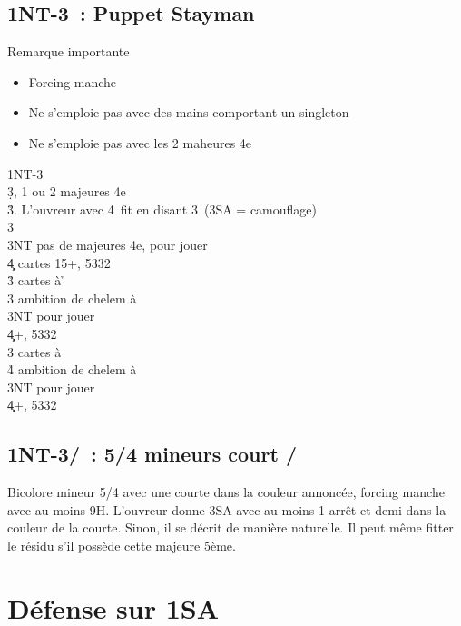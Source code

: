 \documentclass[a4paper]{article}
\begin{document}
\subsection{1NT-3\pdfc\ : Puppet Stayman}

Remarque importante

\begin{itemize}
\item Forcing manche

\item Ne s'emploie pas avec des mains comportant un singleton 

\item Ne s'emploie pas avec les 2 maheures 4e

\end{itemize}

\begin{bidtable}
1NT-3\c\\
3\d {}, 1 ou 2 majeures 4e\+\\
3\h {}\s . L'ouvreur avec 4\s\ fit en disant 3\s\ (3SA = camouflage)\\
3\s {}\h \\
3NT \> pas de majeures 4e, pour jouer\\
4\c\d {} cartes 15+, 5332\-\\
3\h {} cartes à \h \+\\
3\s \> ambition de chelem à \h \\
3NT \> pour jouer\\
4\c\d {}+, 5332\-\\
3\s {} cartes à \s \+\\
4\h \> ambition de chelem à \s \\
3NT \> pour jouer\\
4\c\d {}+, 5332\-
\end{bidtable}

\subsection{1NT-3\pdfh/\pdfs\ : 5/4 mineurs court \pdfh/\pdfs}

Bicolore mineur 5/4 avec une courte dans la couleur annoncée, forcing manche avec au 
moins 9H. L’ouvreur donne 3SA avec au moins 1 arrêt et demi dans la couleur de la courte.
Sinon, il se décrit de manière naturelle. Il peut même fitter le résidu s’il possède cette majeure 5ème.

\section{Défense sur 1SA}
\end{document}
